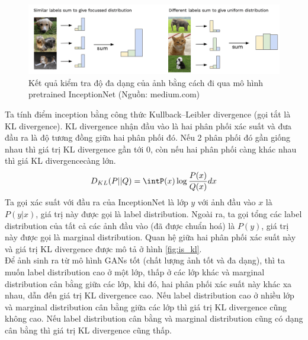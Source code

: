 {    \begin{figure}[H]
    \centering
    \includegraphics[width=13cm] {images/inception_3.png}
    \caption{Kết quả kiểm tra độ đa dạng của ảnh bằng cách đi qua mô hình pretrained InceptionNet (Nguồn: medium.com)}
    \label{fig:inception}
    \end{figure}
    \noindent Ta tính điểm inception bằng công thức Kullback–Leibler divergence (gọi tắt là KL divergence). KL divergence nhận đầu vào là hai phân phối xác suất và đưa đầu ra là độ tương đồng giữa hai phân phối đó. Nếu 2 phân phối đó gần giống nhau thì giá trị KL divergence gần tới 0, còn nếu hai phân phối càng khác nhau thì giá KL divergencecàng lớn.
    \begin{align}
        D_{KL}(P||Q) = \intP(x)\log\frac{P(x)}{Q(x)}dx
    \end{align}
    Ta gọi xác suất với đầu ra của InceptionNet là lớp $y$ với ảnh đầu vào $x$ là $P(y|x)$, giá trị này được gọi là label distribution. Ngoài ra, ta gọi tổng các label distribution của tất cả các ảnh đầu vào (đã được chuẩn hoá) là $P(y)$, giá trị này được gọi là marginal distribution. Quan hệ giữa hai phân phối xác suất này và giá trị KL divergence được mô tả ở hình \ref{fig:is_kl}.\\
    Để ảnh sinh ra từ mô hình GANs tốt (chất lượng ảnh tốt và đa dạng), thì ta muốn label distribution cao ở một lớp, thấp ở các lớp khác và marginal distribution cân bằng giữa các lớp, khi đó, hai phân phối xác suất này khác xa nhau, dẫn đến giá trị KL divergence cao. Nếu label distribution cao ở nhiều lớp và marginal distribution cân bằng giữa các lớp thì giá trị KL divergence cũng không cao. Nếu label distribution cân bằng và marginal distribution cũng có dạng cân bằng thì giá trị KL divergence cũng thấp.\\
}
